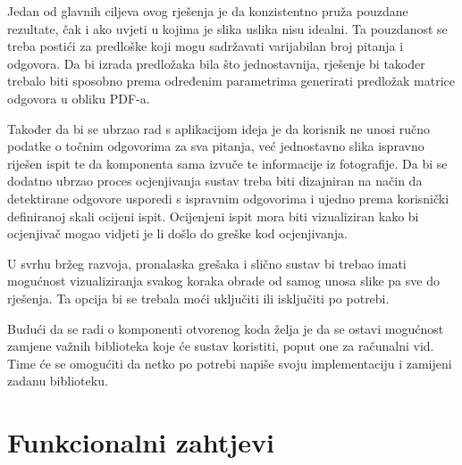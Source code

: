 \documentclass{foi}
\begin{document}
Jedan od glavnih ciljeva ovog rješenja je da konzistentno pruža pouzdane rezultate, čak i ako uvjeti u kojima je slika uslika nisu idealni. Ta pouzdanost se treba postići za predloške koji mogu sadržavati varijabilan broj pitanja i odgovora. Da bi izrada predložaka bila što jednostavnija, rješenje bi također trebalo biti sposobno prema određenim parametrima generirati predložak matrice odgovora u obliku PDF-a. 

Također da bi se ubrzao rad s aplikacijom ideja je da korisnik ne unosi ručno podatke o točnim odgovorima za sva pitanja, već jednostavno slika ispravno riješen ispit te da komponenta sama izvuče te informacije iz fotografije. Da bi se dodatno ubrzao proces ocjenjivanja sustav treba biti dizajniran na način da detektirane odgovore usporedi s ispravnim odgovorima i ujedno prema korisnički definiranoj skali ocijeni ispit. Ocijenjeni ispit mora biti vizualiziran kako bi ocjenjivač mogao vidjeti je li došlo do greške kod ocjenjivanja.

U svrhu bržeg razvoja, pronalaska grešaka i slično sustav bi trebao imati mogućnost vizualiziranja svakog koraka obrade od samog unosa slike pa sve do rješenja. Ta opcija bi se trebala moći uključiti ili isključiti po potrebi. 

Budući da se radi o komponenti otvorenog koda želja je da se ostavi mogućnost zamjene važnih biblioteka koje će sustav koristiti, poput one za računalni vid. Time će se omogućiti da netko po potrebi napiše svoju implementaciju i zamijeni zadanu biblioteku.

\pagebreak

\section{Funkcionalni zahtjevi}
\end{document}

